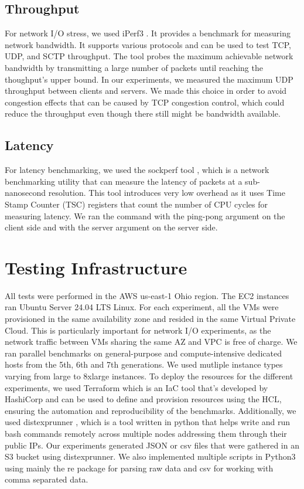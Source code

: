 \subsection{Throughput}
For network I/O stress, we used iPerf3 \cite{iperf}. It provides a benchmark for measuring network 
bandwidth. It supports various protocols and can be used to test TCP, UDP, and SCTP 
throughput.  The tool probes the maximum achievable network bandwidth by transmitting a large number 
of packets until reaching the thoughput's upper bound. In our experiments, we measured the 
maximum UDP throughput between clients and servers. We made this choice in order to avoid congestion 
effects that can be caused by TCP congestion control, which could reduce the throughput even though 
there still might be bandwidth available. 
\subsection{Latency}
For latency benchmarking, we used the sockperf tool \cite{sockperf}, which is a network benchmarking 
utility that can measure the latency of packets at a sub-nanosecond resolution. 
This tool introduces very low overhead as it uses Time Stamp Counter (TSC) registers that count 
the number of CPU cycles for measuring latency. We ran the command with the ping-pong argument on the 
client side and with the server argument on the server side.

\section{Testing Infrastructure}
All tests were performed in the AWS us-east-1 Ohio region. The EC2 instances ran Ubuntu Server 24.04 LTS
Linux. For each experiment, all the VMs were provisioned in the same availability zone and resided
in the same Virtual Private Cloud. This is particularly important for network I/O experiments, as 
the network traffic between VMs sharing the same AZ and VPC is free of charge. We ran parallel 
benchmarks on general-purpose and compute-intensive dedicated hosts from the 5th, 6th 
and 7th generations. We used mutliple instance types varying from large to 8xlarge instances.
To deploy the resources for the different experiments, we used Terraform which is an \ac{IaC} tool 
that's developed by HashiCorp and can be used to define and provision resources using the \ac{HCL}, 
ensuring the automation and reproducibility of the benchmarks. 
Additionally, we used distexprunner \cite{distex}, which is a tool written in python 
that helps write and run bash commands remotely across multiple nodes addressing them through 
their public IPs. Our experiments generated JSON or csv files that were gathered in an S3 
bucket using distexprunner. We also implemented multiple scripts in Python3 using mainly the re 
package \cite{re} for parsing raw data and csv \cite{csv} for working with comma separated data.
